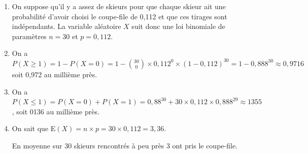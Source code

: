 \documentclass[10pt]{article}
\providecommand{\np}[2][]{{#2~#1}}
\begin{document}
\begin{enumerate}
\item 
On suppose qu'il y a assez de skieurs pour que chaque skieur ait une probabilité d'avoir choisi le coupe-file de 0,112 et que ces tirages sont indépendants. La variable aléatoire $X$ suit donc une loi binomiale de paramètres $n = 30$ et $p = 0,112$. 
\item 
On a $P(X \geqslant 1) = 1 - P(X = 0) = 1 - \binom{30}{0} \times 0,112^0 \times (1 - 0,112)^{30} = 1 - 0,888^{30} \approx \np{0,9716}$ soit 0,972 au millième près.
\item 
On a $P(X \leqslant 1) = P(X = 0) + P(X = 1) = 0,88^{30} + 30 \times 0,112 \times 0,888^{29} \approx \np{1355}$, soit 0136 au millième près.

\item 
On sait que E$(X) = n \times p = 30 \times 0,112 = 3,36$.

En moyenne sur 30 skieurs rencontrés à peu près 3 ont pris le coupe-file.
\end{enumerate}

\bigskip
\end{document}
